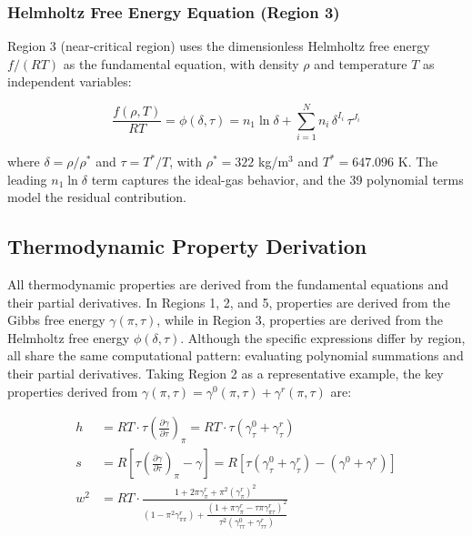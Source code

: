 \documentclass{article}
\begin{document}
\subsubsection{Helmholtz Free Energy Equation (Region 3)}

Region 3 (near-critical region) uses the dimensionless Helmholtz free energy $f/(RT)$ as the fundamental equation, with density $\rho$ and temperature $T$ as independent variables:

\begin{equation}
\frac{f(\rho,T)}{RT} = \phi(\delta,\tau) = n_1 \ln\delta + \sum_{i=1}^{N} n_i \, \delta^{I_i} \, \tau^{J_i}
\label{eq:helmholtz}
\end{equation}

where $\delta = \rho/\rho^{*}$ and $\tau = T^{*}/T$, with $\rho^{*} = 322$ kg/m$^3$ and $T^{*} = 647.096$ K. The leading $n_1 \ln\delta$ term captures the ideal-gas behavior, and the 39 polynomial terms model the residual contribution.


\subsection{Thermodynamic Property Derivation}

All thermodynamic properties are derived from the fundamental equations and their partial derivatives. In Regions 1, 2, and 5, properties are derived from the Gibbs free energy $\gamma(\pi,\tau)$, while in Region 3, properties are derived from the Helmholtz free energy $\phi(\delta,\tau)$. Although the specific expressions differ by region, all share the same computational pattern: evaluating polynomial summations and their partial derivatives. Taking Region 2 as a representative example, the key properties derived from $\gamma(\pi,\tau) = \gamma^0(\pi,\tau) + \gamma^r(\pi,\tau)$ are:

\begin{align}
h &= RT \cdot \tau \left( \frac{\partial \gamma}{\partial \tau} \right)_\pi
    = RT \cdot \tau \left( \gamma^0_\tau + \gamma^r_\tau \right) \\
s &= R \left[ \tau \left( \frac{\partial \gamma}{\partial \tau} \right)_\pi - \gamma \right]
    = R \left[ \tau \left( \gamma^0_\tau + \gamma^r_\tau \right) - \left( \gamma^0 + \gamma^r \right) \right] \label{eq:entropy} \\
w^2 &= RT \cdot \frac{1 + 2\pi\gamma^r_\pi + \pi^2(\gamma^r_\pi)^2}{\left( 1 - \pi^2\gamma^r_{\pi\pi} \right) + \dfrac{\left( 1 + \pi\gamma^r_\pi - \tau\pi\gamma^r_{\pi\tau} \right)^2}{\tau^2\left( \gamma^0_{\tau\tau} + \gamma^r_{\tau\tau} \right)}} \label{eq:speed}
\end{align}
\end{document}
